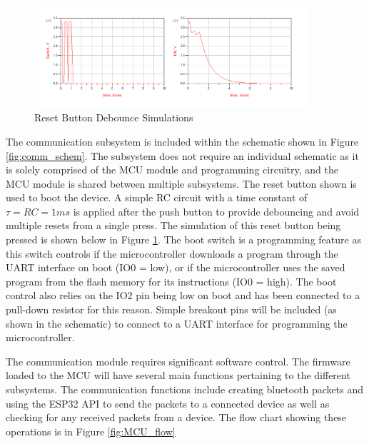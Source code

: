\documentclass[12pt]{article}
\begin{document}
\begin{figure}[!h]
	\centering
	\includegraphics[width=0.9\textwidth]{reset_debounce.png}
	\caption{Reset Button Debounce Simulations}
	\label{fig:reset_debounce}
\end{figure}

The communication subsystem is included within the schematic shown in Figure \ref{fig:comm_schem}. The subsystem does not require an individual schematic as it is solely comprised of the MCU module and programming circuitry, and the MCU module is shared between multiple subsystems. The reset button shown is used to boot the device. A simple RC circuit with a time constant of $\tau = RC = 1ms$ is applied after the push button to provide debouncing and avoid multiple resets from a single press. The simulation of this reset button being pressed is shown below in Figure \ref{fig:reset_debounce}. The boot switch is a programming feature as this switch controls if the microcontroller downloads a program through the UART interface on boot (IO0 = low), or if the microcontroller uses the saved program from the flash memory for its instructions (IO0 = high). The boot control also relies on the IO2 pin being low on boot and has been connected to a pull-down resistor for this reason. Simple breakout pins will be included (as shown in the schematic) to connect to a UART interface for programming the microcontroller.

The communication module requires significant software control. The firmware loaded to the MCU will have several main functions pertaining to the different subsystems. The communication functions include creating bluetooth packets and using the ESP32 API to send the packets to a connected device as well as checking for any received packets from a device. The flow chart showing these operations is in Figure \ref{fig:MCU_flow}
\end{document}

